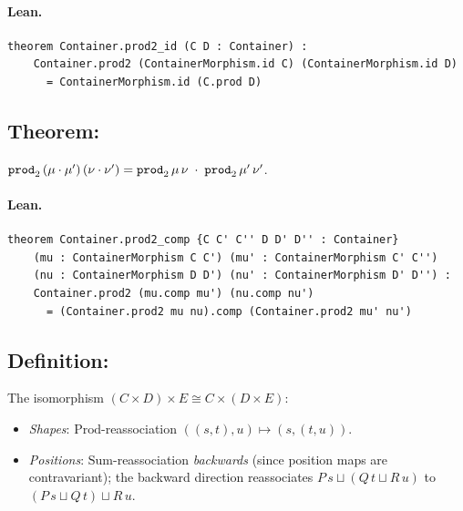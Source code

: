 \documentclass[11pt,a4paper]{article}
\begin{document}
\paragraph{Lean.}
\begin{lstlisting}[style=lean]
theorem Container.prod2_id (C D : Container) :
    Container.prod2 (ContainerMorphism.id C) (ContainerMorphism.id D)
      = ContainerMorphism.id (C.prod D)
\end{lstlisting}


\subsection{Theorem: }

\begin{thm}
$\texttt{prod}_2\,(\mu \cdot \mu')\,(\nu \cdot \nu')
= \texttt{prod}_2\,\mu\,\nu \;\cdot\; \texttt{prod}_2\,\mu'\,\nu'$.
\end{thm}

\paragraph{Lean.}
\begin{lstlisting}[style=lean]
theorem Container.prod2_comp {C C' C'' D D' D'' : Container}
    (mu : ContainerMorphism C C') (mu' : ContainerMorphism C' C'')
    (nu : ContainerMorphism D D') (nu' : ContainerMorphism D' D'') :
    Container.prod2 (mu.comp mu') (nu.comp nu')
      = (Container.prod2 mu nu).comp (Container.prod2 mu' nu')
\end{lstlisting}


\subsection{Definition: }

\begin{defn}
The isomorphism $(C \times D) \times E \cong C \times (D \times E)$:
\begin{itemize}
  \item \emph{Shapes}: $\mathrm{Prod}$-reassociation
    $((s,t),u) \mapsto (s,(t,u))$.
  \item \emph{Positions}: $\mathrm{Sum}$-reassociation \emph{backwards}
    (since position maps are contravariant); the backward direction reassociates
    $P\,s \sqcup (Q\,t \sqcup R\,u)$ to $(P\,s \sqcup Q\,t) \sqcup R\,u$.
\end{itemize}
\end{defn}
\end{document}

